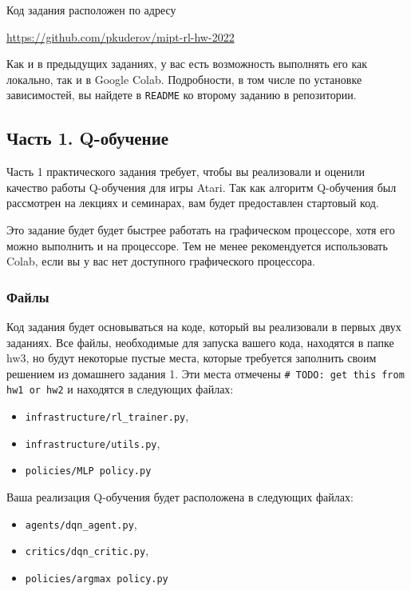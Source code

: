 \documentclass[12pt, oneside]{article}
\begin{document}
Код задания расположен по адресу
\begin{center}
    \href{https://github.com/pkuderov/mipt-rl-hw-2022}{https://github.com/pkuderov/mipt-rl-hw-2022}
\end{center}

Как и в предыдущих заданиях, у вас есть возможность выполнять его как локально, так и в Google Colab. Подробности, в том числе по установке зависимостей, вы найдете в \verb|README| ко второму заданию в репозитории.

\subsection{Часть 1. Q-обучение}

Часть 1 практического задания требует, чтобы вы реализовали и оценили качество работы Q-обучения для игры Atari. Так как алгоритм Q-обучения был рассмотрен на лекциях и семинарах, вам будет предоставлен стартовый код.

Это задание будет будет быстрее работать на графическом процессоре, хотя его можно выполнить и на процессоре. Тем не менее рекомендуется использовать Colab, если вы у вас нет доступного графического процессора.

\subsubsection{Файлы}

Код задания будет основываться на коде, который вы реализовали в первых двух заданиях. Все файлы, необходимые для запуска вашего кода, находятся в папке hw3, но будут некоторые пустые места, которые требуется заполнить своим решением из домашнего задания 1. Эти места отмечены \verb|# TODO: get this from hw1 or hw2| и находятся в следующих файлах:

\begin{itemize}
    \item \verb|infrastructure/rl_trainer.py|,
    \item \verb|infrastructure/utils.py|,
    \item \verb|policies/MLP policy.py|
\end{itemize}

Ваша реализация Q-обучения будет расположена в следующих файлах:

\begin{itemize}
    \item \verb|agents/dqn_agent.py|,
    \item \verb|critics/dqn_critic.py|,
    \item \verb|policies/argmax policy.py|
\end{itemize}
\end{document}
